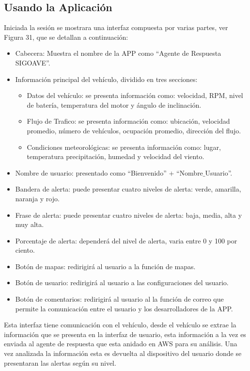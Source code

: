 \documentclass[a4paper,10pt, oneside, titlepage]{article}
\begin{document}
	\subsection{Usando la Aplicación}
	Iniciada la sesión se mostrara una interfaz compuesta por varias partes, ver Figura 31, que se detallan a continuación:
	\begin{itemize}
		\item Cabecera: Muestra el nombre de la APP como ``Agente de Respuesta SIGOAVE''.
		\item Información principal del vehículo, dividido en tres secciones:
		\begin{itemize}
			\item Datos del vehículo: se presenta información como: velocidad, RPM, nivel de batería, temperatura del motor y ángulo de inclinación.
			\item Flujo de Trafico: se presenta información como: ubicación, velocidad promedio, número de vehículos, ocupación promedio, dirección del flujo.
			\item Condiciones meteorológicas: se presenta información como: lugar, temperatura precipitación, humedad y velocidad del viento.
		\end{itemize}
		\item Nombre de usuario: presentado como ``Bienvenido'' $+$ ``Nombre$\_$Usuario''.
		\item Bandera de alerta: puede presentar cuatro niveles de alerta: verde, amarilla, naranja y rojo.
		\item Frase de alerta: puede presentar cuatro niveles de alerta: baja, media, alta y muy alta.
		\item Porcentaje de alerta: dependerá del nivel de alerta, varia entre 0 y 100 por ciento.
		\item Botón de mapas: redirigirá al usuario a la función de mapas.
		\item Botón de usuario: redirigirá al usuario a las configuraciones del usuario.
		\item Botón de comentarios: redirigirá al usuario al la función de correo que permite la comunicación entre el usuario y los desarrolladores de la APP.
	\end{itemize}
	Esta interfaz tiene comunicación con el vehículo, desde el vehículo se extrae la información que se presenta en la interfaz de usuario, esta información a la vez es enviada al agente de respuesta que esta anidado en AWS para su análisis. Una vez analizada la información esta es devuelta al dispositivo del usuario donde se presentaran las alertas según su nivel.\\\\
\end{document}
